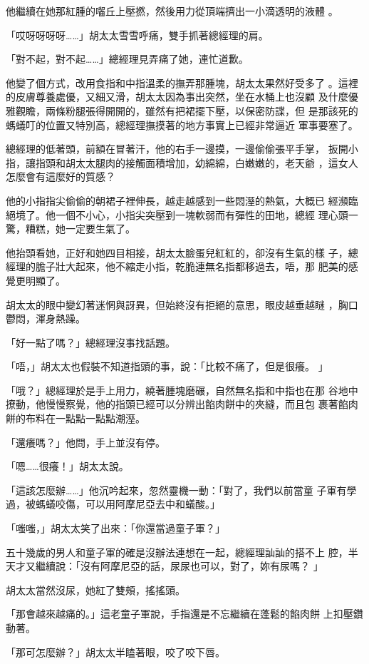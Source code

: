 他繼續在她那紅腫的囓丘上壓撚，然後用力從頂端擠出一小滴透明的液體
。

「哎呀呀呀呀……」胡太太雪雪呼痛，雙手抓著總經理的肩。

「對不起，對不起……」總經理見弄痛了她，連忙道歉。

他變了個方式，改用食指和中指溫柔的撫弄那腫塊，胡太太果然好受多了
。這裡的皮膚尊養處優，又細又滑，胡太太因為事出突然，坐在水桶上也沒顧
及什麼優雅觀瞻，兩條粉腿張得開開的，雖然有把裙擺下壓，以保密防諜，但
是那該死的螞蟻叮的位置又特別高，總經理撫摸著的地方事實上已經非常逼近
軍事要塞了。

總經理的低著頭，前額在冒著汗，他的右手一邊摸，一邊偷偷張平手掌，
扳開小指，讓指頭和胡太太腿肉的接觸面積增加，幼綿綿，白嫩嫩的，老天爺
，這女人怎麼會有這麼好的質感？

他的小指指尖偷偷的朝裙子裡伸長，越走越感到一些悶溼的熱氣，大概已
經瀕臨絕境了。他一個不小心，小指尖突壓到一塊軟弱而有彈性的田地，總經
理心頭一驚，糟糕，她一定要生氣了。

他抬頭看她，正好和她四目相接，胡太太臉蛋兒紅紅的，卻沒有生氣的樣
子，總經理的膽子壯大起來，他不縮走小指，乾脆連無名指都移過去，唔，那
肥美的感覺更明顯了。

胡太太的眼中變幻著迷惘與訝異，但始終沒有拒絕的意思，眼皮越垂越瞇
，胸口鬱悶，渾身熱躁。

「好一點了嗎？」總經理沒事找話題。

「唔，」胡太太也假裝不知道指頭的事，說：「比較不痛了，但是很癢。
」

「哦？」總經理於是手上用力，繞著腫塊磨碾，自然無名指和中指也在那
谷地中撩動，他慢慢察覺，他的指頭已經可以分辨出餡肉餅中的夾縫，而且包
裹著餡肉餅的布料在一點點一點點潮溼。

「還癢嗎？」他問，手上並沒有停。

「嗯……很癢！」胡太太說。

「這該怎麼辦……」他沉吟起來，忽然靈機一動：「對了，我們以前當童
子軍有學過，被螞蟻咬傷，可以用阿摩尼亞去中和蟻酸。」

「嗤嗤，」胡太太笑了出來：「你還當過童子軍？」

五十幾歲的男人和童子軍的確是沒辦法連想在一起，總經理訕訕的搭不上
腔，半天才又繼續說：「沒有阿摩尼亞的話，尿尿也可以，對了，妳有尿嗎？
」

胡太太當然沒尿，她紅了雙頰，搖搖頭。

「那會越來越痛的。」這老童子軍說，手指還是不忘繼續在蓬鬆的餡肉餅
上扣壓鑽動著。

「那可怎麼辦？」胡太太半瞌著眼，咬了咬下唇。

